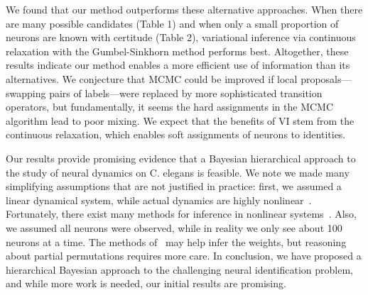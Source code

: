 \documentclass{article}
\begin{document}
We found that our method outperforms these alternative
approaches. When there are many possible candidates (Table 1) and when
only a small proportion of neurons are known with certitude (Table 2),
variational inference via continuous relaxation with the
Gumbel-Sinkhorn method performs best.  Altogether, these results
indicate our method enables a more efficient use of information than
its alternatives. We conjecture that MCMC could be improved if local
proposals---swapping pairs of labels---were replaced by more
sophisticated transition operators, but fundamentally, it seems the
hard assignments in the MCMC algorithm lead to poor mixing.  We expect
that the benefits of VI stem from the continuous relaxation, which
enables soft assignments of neurons to identities.

Our results provide promising evidence that a Bayesian hierarchical
approach to the study of neural dynamics on C. elegans is feasible. We
note we made many simplifying assumptions that are not justified in
practice: first, we assumed a linear dynamical system, while actual
dynamics are highly nonlinear~\citep{Kato2015}. Fortunately, there
exist many methods for inference in nonlinear
systems~\citep{Krishnan2015, linderman2017bayesian}. Also, we assumed
all neurons were observed, while in reality we only see about 100
neurons at a time. The methods of~\citet{Soudry2015} may help
infer the weights, but reasoning about partial permutations requires
more care. In conclusion, we have proposed a hierarchical Bayesian
approach to the challenging neural identification problem, and while
more work is needed, our initial results are promising.



\end{document}
